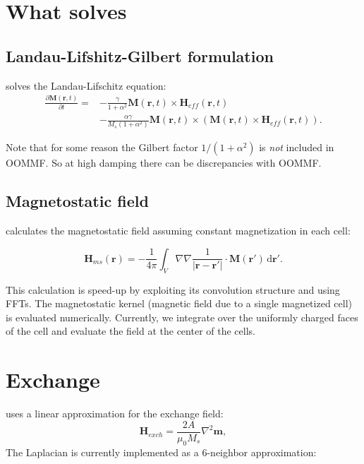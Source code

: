 \section{What \mumax solves}

\subsection{Landau-Lifshitz-Gilbert formulation}

\mumax solves the Landau-Lifschitz equation:
\begin{equation}
\begin{split}
\frac{\partial\mathbf{M}(\mathbf{r}, t)}{\partial t} =
&- \frac{\gamma}{1+\alpha^2}\mathbf{M}(\mathbf{r}, t)\times \mathbf{H}_{eff}(\mathbf{r}, t)\\
&- \frac{\alpha \gamma}{M_s(1+\alpha^2)}\mathbf{M}(\mathbf{r}, t)\times\left(\mathbf{M}(\mathbf{r}, t)\times\mathbf{H}_{eff}(\mathbf{r}, t)\right).\label{LLequation}
\end{split}
\end{equation}

Note that for some reason the Gilbert factor $1/(1+\alpha^2)$ is \emph{not} included in OOMMF. So at high damping there can be discrepancies with OOMMF.

\subsection{Magnetostatic field}

\mumax calculates the magnetostatic field assuming constant magnetization in each cell:

\begin{equation}
\mathbf{H}_{ms}(\mathbf{r})
= -\frac{1}{4\pi}\int_V \nabla\nabla\frac{1}{|\mathbf{r}-\mathbf{r}'|}\cdot\mathbf{M}(\mathbf{r}')
\,\mathrm{d}\mathbf{r}'.
\label{Hms}
\end{equation}

This calculation is speed-up by exploiting its convolution structure and using FFTs. The magnetostatic kernel (magnetic field due to a single magnetized cell) is evaluated numerically. Currently, we integrate over the uniformly charged faces of the cell and evaluate the field at the center of the cells.

\section{Exchange}

\mumax uses a linear approximation for the exchange field:
\begin{equation}
\mathbf{H}_{exch} = \frac{2A}{\mu_0 M_s}\nabla^2\mathbf{m},\label{Hexch}
\end{equation}
The Laplacian is currently implemented as a 6-neighbor approximation:

